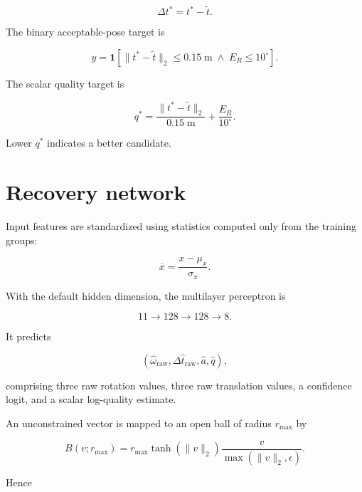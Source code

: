 \documentclass[11pt]{article}
\begin{document}
\begin{equation}
\Delta t^*=t^*-\widetilde t.
\end{equation}

The binary acceptable-pose target is

\begin{equation}
y=\mathbf 1\left[
\lVert t^*-\widetilde t\rVert_2\le0.15\;\mathrm{m}
\;\land\;
E_R\le10^\circ
\right].
\end{equation}

The scalar quality target is

\begin{equation}
q^*=\frac{\lVert t^*-\widetilde t\rVert_2}{0.15\;\mathrm{m}}
+\frac{E_R}{10^\circ}.
\end{equation}

Lower $q^*$ indicates a better candidate.

\section{Recovery network}

Input features are standardized using statistics computed only from the
training groups:

\begin{equation}
\overline x=\frac{x-\mu_x}{\sigma_x}.
\end{equation}

With the default hidden dimension, the multilayer perceptron is

\begin{equation}
11\longrightarrow128\longrightarrow128\longrightarrow8.
\end{equation}

It predicts

\begin{equation}
(\widehat\omega_{\mathrm{raw}},
\Delta\widehat t_{\mathrm{raw}},
\widehat a,
\widehat q),
\end{equation}

comprising three raw rotation values, three raw translation values, a
confidence logit, and a scalar log-quality estimate.

An unconstrained vector is mapped to an open ball of radius $r_{\max}$ by

\begin{equation}
B(v;r_{\max})=
r_{\max}\tanh(\lVert v\rVert_2)
\frac{v}{\max(\lVert v\rVert_2,\epsilon)}.
\end{equation}

Hence
\end{document}
